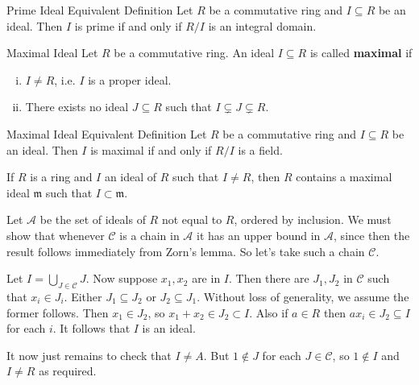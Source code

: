 \begin{proposition}{Prime Ideal Equivalent Definition}{}
    Let $R$ be a commutative ring and $I\subseteq R$ be an ideal. Then $I$ is prime if and only if $R/I$ is an integral domain.
\end{proposition}

\begin{definition}{Maximal Ideal}{}
    Let $R$ be a commutative ring. An ideal $I\subseteq R$ is called \textbf{maximal} if
    \begin{enumerate}[(i)]
        \item $I\ne R$, i.e. $I$ is a proper ideal.
        \item There exists no ideal $J\subseteq R$ such that $I\subsetneq J\subsetneq R$.
    \end{enumerate}
\end{definition}

\begin{proposition}{Maximal Ideal Equivalent Definition}{}
    Let $R$ be a commutative ring and $I\subseteq R$ be an ideal. Then $I$ is maximal if and only if $R/I$ is a field.  
\end{proposition}

\begin{proposition}{}{}
    If $R$ is a ring and $I$ an ideal of $R$ such that $I \neq R$, then $R$ contains a maximal ideal $\mathfrak{m}$ such that $I \subset \mathfrak{m}$.
\end{proposition}

\begin{prf}
    Let $\mathcal{A}$ be the set of ideals of $R$ not equal to $R$, ordered by inclusion. We must show that whenever $\mathcal{C}$ is a chain in $\mathcal{A}$ it has an upper bound in $\mathcal{A}$, since then the result follows immediately from Zorn's lemma. So let's take such a chain $\mathcal{C}$.

Let $I=\bigcup_{J \in \mathcal{C}} J$. Now suppose $x_1, x_2$ are in $I$. Then there are $J_1, J_2$ in $\mathcal{C}$ such that $x_i \in J_i$. Either $J_1 \subseteq J_2$ or $J_2 \subseteq J_1$. Without loss of generality, we assume the former follows. Then $x_1 \in J_2$, so $x_1+x_2 \in J_2 \subset I$. Also if $a \in R$ then $a x_i \in J_2 \subseteq I$ for each $i$. It follows that $I$ is an ideal.

It now just remains to check that $I \neq A$. But $1 \notin J$ for each $J \in \mathcal{C}$, so $1 \notin I$ and $I \neq R$ as required.
\end{prf}

